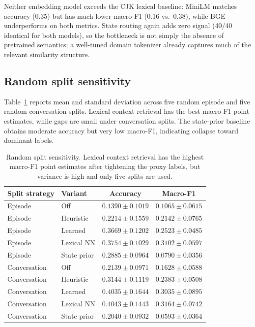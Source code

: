 Neither embedding model exceeds the CJK lexical baseline: MiniLM matches accuracy (0.35) but has much lower macro-F1 (0.16 vs.\ 0.38), while BGE underperforms on both metrics. State routing again adds zero signal (40/40 identical for both models), so the bottleneck is not simply the absence of pretrained semantics; a well-tuned domain tokenizer already captures much of the relevant similarity structure.

\subsection{Random split sensitivity}

Table~\ref{tab:robust} reports mean and standard deviation across five random episode and five random conversation splits. Lexical context retrieval has the best macro-F1 point estimates, while gaps are small under conversation splits. The state-prior baseline obtains moderate accuracy but very low macro-F1, indicating collapse toward dominant labels.

\begin{table}[tbp]
\centering
\small
\begin{tabular}{llcc}
\toprule
Split strategy & Variant & Accuracy & Macro-F1 \\
\midrule
Episode & Off & $0.1390 \pm 0.1019$ & $0.1065 \pm 0.0615$ \\
Episode & Heuristic & $0.2214 \pm 0.1559$ & $0.2142 \pm 0.0765$ \\
Episode & Learned & $0.3669 \pm 0.1202$ & $0.2523 \pm 0.0485$ \\
Episode & Lexical NN & $\mathbf{0.3754 \pm 0.1029}$ & $\mathbf{0.3102 \pm 0.0597}$ \\
Episode & State prior & $0.2885 \pm 0.0964$ & $0.0790 \pm 0.0356$ \\
\midrule
Conversation & Off & $0.2139 \pm 0.0971$ & $0.1628 \pm 0.0588$ \\
Conversation & Heuristic & $0.3144 \pm 0.1119$ & $0.2383 \pm 0.0508$ \\
Conversation & Learned & $0.4035 \pm 0.1644$ & $0.3035 \pm 0.0895$ \\
Conversation & Lexical NN & $\mathbf{0.4043 \pm 0.1443}$ & $\mathbf{0.3164 \pm 0.0742}$ \\
Conversation & State prior & $0.2040 \pm 0.0932$ & $0.0593 \pm 0.0364$ \\
\bottomrule
\end{tabular}
\caption{Random split sensitivity. Lexical context retrieval has the highest macro-F1 point estimates after tightening the proxy labels, but variance is high and only five splits are used.}
\label{tab:robust}
\end{table}

